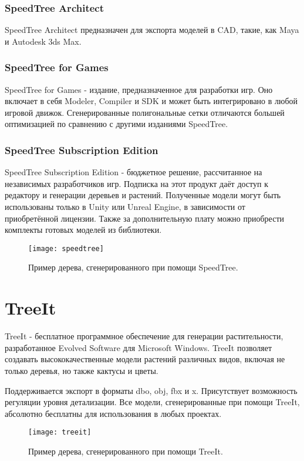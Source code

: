 \subsubsection{SpeedTree Architect}
SpeedTree Architect предназначен для экспорта моделей в CAD, такие, как Maya и Autodesk 3ds Max.

\subsubsection{SpeedTree for Games}
SpeedTree for Games - издание, предназначенное для разработки игр. Оно включает в себя Modeler, Compiler и SDK и может быть интегрировано в любой игровой движок. Сгенерированные полигональные сетки отличаются большей оптимизацией по сравнению с другими изданиями SpeedTree.

\subsubsection{SpeedTree Subscription Edition}
SpeedTree Subscription Edition - бюджетное решение, рассчитанное на независимых разработчиков игр. Подписка на этот продукт даёт доступ к редактору и генерации деревьев и растений. Полученные модели могут быть использованы только в Unity или Unreal Engine, в зависимости от приобретённой лицензии. Также за дополнительную плату можно приобрести комплекты готовых моделей из библиотеки.

\begin{figure}[h]
    \centering
    \texttt{[image: speedtree]}
    \caption{Пример дерева, сгенерированного при помощи SpeedTree.}
\end{figure}

\section{TreeIt}
TreeIt - бесплатное программное обеспечение для генерации растительности, разработанное Evolved Software для Microsoft Windows. TreeIt позволяет создавать высококачественные модели растений различных видов, включая не только деревья, но также кактусы и цветы.

Поддерживается экспорт в форматы dbo, obj, fbx и x. Присутствует возможность регуляции уровня детализации. Все модели, сгенерированные при помощи TreeIt, абсолютно бесплатны для использования в любых проектах.

\begin{figure}[h]
    \centering
    \texttt{[image: treeit]}
    \caption{Пример дерева, сгенерированного при помощи TreeIt.}
\end{figure}

